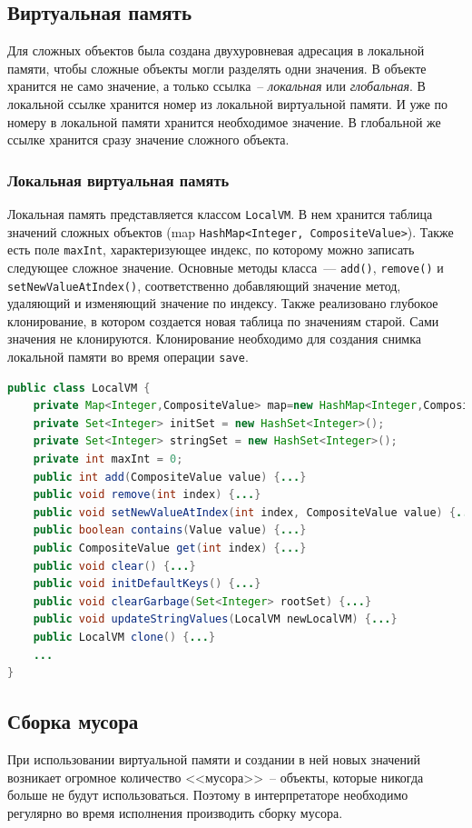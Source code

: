 \documentclass[14pt]{extarticle}
\begin{document}
\subsection{Виртуальная память}
Для сложных объектов была создана двухуровневая адресация в локальной памяти, чтобы сложные объекты могли разделять одни значения. В объекте хранится не само значение, а только ссылка~-- \textit{локальная} или \textit{глобальная}. В локальной ссылке хранится номер из локальной виртуальной памяти. И уже по номеру в локальной памяти хранится необходимое значение. В глобальной же ссылке хранится сразу значение сложного объекта.

\subsubsection*{Локальная виртуальная память}
Локальная память представляется классом \texttt{LocalVM}. В нем хранится таблица значений сложных объектов (map \texttt{HashMap<Integer, CompositeValue>}). Также есть поле \texttt{maxInt}, характеризующее индекс, по которому можно записать следующее сложное значение. Основные методы класса~--- \texttt{add()}, \texttt{remove()} и \texttt{setNewValueAtIndex()}, соответственно добавляющий значение метод, удаляющий и изменяющий значение по индексу. Также реализовано глубокое клонирование, в котором создается новая таблица по значениям старой. Сами значения не клонируются. Клонирование необходимо для создания снимка локальной памяти во время операции \texttt{save}. 

\begin{lstlisting}[label=LocalVM,caption=Интерфейс класса LocalVM, frame = none, language = Java]
public class LocalVM {
    private Map<Integer,CompositeValue> map=new HashMap<Integer,CompositeValue>();
    private Set<Integer> initSet = new HashSet<Integer>();
    private Set<Integer> stringSet = new HashSet<Integer>();
    private int maxInt = 0;
    public int add(CompositeValue value) {...}
    public void remove(int index) {...}
    public void setNewValueAtIndex(int index, CompositeValue value) {...}
    public boolean contains(Value value) {...}
    public CompositeValue get(int index) {...}
    public void clear() {...}
    public void initDefaultKeys() {...}
    public void clearGarbage(Set<Integer> rootSet) {...}
    public void updateStringValues(LocalVM newLocalVM) {...}
    public LocalVM clone() {...}
    ...
}
\end{lstlisting}

\subsection{Сборка мусора}
При использовании виртуальной памяти и создании в ней новых значений возникает огромное количество <<мусора>>~-- объекты, которые никогда больше не будут использоваться. Поэтому в интерпретаторе необходимо регулярно во время исполнения производить сборку мусора.
\end{document}
